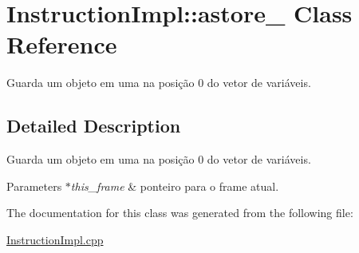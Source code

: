 \hypertarget{class_instruction_impl_1_1astore__0}{}\section{Instruction\+Impl\+:\+:astore\+\_ Class Reference}
\label{class_instruction_impl_1_1astore__0}


Guarda um objeto em uma na posição 0 do vetor de variáveis.  




\subsection{Detailed Description}
Guarda um objeto em uma na posição 0 do vetor de variáveis. 


\begin{DoxyParams}{Parameters}
{\em $\ast$this\+\_\+frame} & ponteiro para o frame atual.  \\
\hline
\end{DoxyParams}


The documentation for this class was generated from the following file\+:\begin{DoxyCompactItemize}
\item 
\hyperlink{_instruction_impl_8cpp}{Instruction\+Impl.\+cpp}\end{DoxyCompactItemize}

